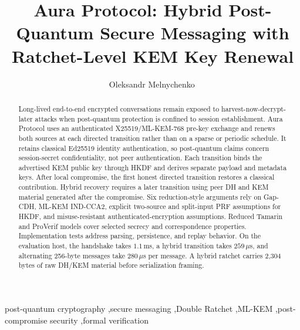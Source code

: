 \documentclass[preprint,12pt]{elsarticle}
\date{}
\theoremstyle{definition}
\begin{document}
\begin{frontmatter}

\title{Aura Protocol: Hybrid Post-Quantum Secure Messaging with Ratchet-Level KEM Key Renewal}

\author{Oleksandr Melnychenko\texorpdfstring{\,}{}\texorpdfstring{}{}}

\address{Khmelnytskyi National University, Khmelnytskyi, Ukraine}


\begin{abstract}
Long-lived end-to-end encrypted conversations remain exposed to
harvest-now-decrypt-later attacks when post-quantum protection is confined to
session establishment. Aura Protocol uses an authenticated X25519/ML-KEM-768
pre-key exchange and renews both sources at each directed transition rather
than on a sparse or periodic schedule. It retains classical Ed25519 identity
authentication, so post-quantum claims concern session-secret confidentiality,
not peer authentication. Each transition binds the advertised KEM public key
through HKDF and derives separate payload and metadata keys. After local
compromise, the first honest directed transition restores a classical contribution. Hybrid
recovery requires a later transition using peer DH and KEM material generated
after the compromise. Six reduction-style arguments rely on Gap-CDH, ML-KEM IND-CCA2, explicit
two-source and split-input PRF assumptions for HKDF, and misuse-resistant
authenticated-encryption assumptions.
Reduced Tamarin and ProVerif models cover selected secrecy and correspondence
properties. Implementation tests address parsing, persistence, and replay
behavior. On the evaluation host, the handshake takes $1.1$\,ms, a hybrid
transition takes $259\,\mu$s, and alternating 256-byte messages take
$280\,\mu$s per message. A hybrid ratchet carries 2{,}304 bytes of raw
DH/KEM material before serialization framing.
\end{abstract}
\vspace{-0.9\baselineskip}

\begin{keyword}
post-quantum cryptography \sep secure messaging \sep Double Ratchet \sep ML-KEM \sep post-compromise security \sep formal verification
\end{keyword}

\end{frontmatter}
\end{document}
